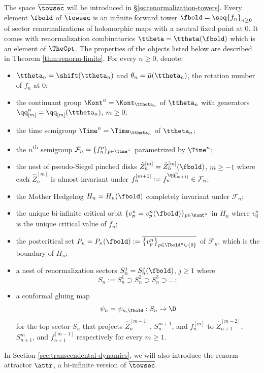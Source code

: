 \documentclass{amsart}
\begin{document}
The space $\overline{\towsec}$ will be introduced in \S\ref{ss:renormalization-towers}.
Every element $\fbold$ of $\overline{\towsec}$ is an infinite forward tower $\fbold = \seq{f_n}_{n\geq 0}$ of sector renormalizations of holomorphic maps with a neutral fixed point at $0$.
It comes with renormalization combinatorics $\ttheta = \ttheta(\fbold)$ which is an element of $\TheCpt$.
The properties of the objects listed below are described in Theorem \ref{thm:renorm-limits}.
For every $n \geq 0$, denote:
\begin{itemize}
    \item $\ttheta_n = \shift(\ttheta_n)$ and $\theta_n = \bar{\mu}(\ttheta_n)$, the rotation number of $f_n$ at $0$;
    \item the continuant group $\Kont^{n} = \Kont_{\ttheta_n}$ of $\ttheta_n$ with generators $\qq^n_{[m]} = \qq_{[m]}(\ttheta_n)$, $m \geq 0$;
    \item the time semigroup $\Time^n = \Time_{\ttheta_n}$ of $\ttheta_n$;
    \item the $n$\textsuperscript{\textnormal{th}} semigroup $\mathcal{F}_n = \{ f_n ^p \}_{p \in \Time^n}$ parametrized by $\Time^n$;
    \item the nest of pseudo-Siegel pinched disks $\hat{Z}_n^{[m]}=\hat{Z}_n^{[m]}(\fbold)$, $m \geq -1$ where each $\hat{Z}_n^{[m]}$ is almost invariant under $f_n^{[m+1]} := f_n^{\qq^n_{[m+1]}} \in \mathcal{F}_n$;
    \item the Mother Hedgehog $H_n=H_n(\fbold)$ completely invariant under $\mathcal{F}_n$;
    \item the unique bi-infinite critical orbit $\{v^n_{p} = v^n_{p}(\fbold)\}_{p \in \Kont^{n}}$ in $H_n$ where $v^n_{0}$ is the unique critical value of $f_n$;
    \item the postcritical set $P_n = P_n(\fbold) := \overline{ \big\{ v^n_{p} \big\}_{p \in \Tbold^n \cup \{0\}} }$ of $\mathcal{F}_n$, which is the boundary of $H_n$;
    \item a nest of renormalization sectors $S_n^j = S_n^j(\fbold)$, $j \geq 1$ where
    \[
        S_n := S_n^1 \supset S_n^2 \supset S_n^3 \supset \ldots;
    \]
    \item a conformal gluing map 
    \[
        \psi_n = \psi_{n,\fbold}: S_n \to \D
    \]
    for the top sector $S_n$ that projects $\hat{Z}_n^{[m-1]}$, $S_n^{m+1}$, and $f_n^{[m]}$ 
    to $\hat{Z}_{n+1}^{[m-2]}$, $S_{n+1}^{m}$, and $f_{n+1}^{[m-1]}$ respectively for every $m \geq 1$.
\end{itemize}
In Section \ref{sec:transcendental-dynamics}, we will also introduce the renorm-attractor $\attr$, a bi-infinite version of $\overline{\towsec}$.
\end{document}
